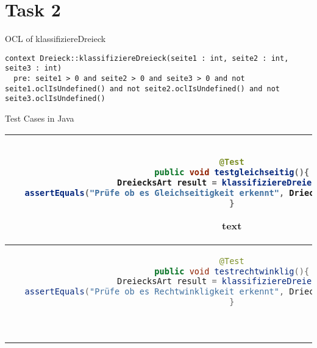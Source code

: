 \chapter{Task 2}
\begin{parlist}
 \item OCL of klassifiziereDreieck
 \begin{lstlisting}[language=OCL,frame=trBL]
context Dreieck::klassifiziereDreieck(seite1 : int, seite2 : int, seite3 : int) 
  pre: seite1 > 0 and seite2 > 0 and seite3 > 0 and not seite1.oclIsUndefined() and not seite2.oclIsUndefined() and not seite3.oclIsUndefined()
\end{lstlisting}
\item Test Cases in Java

\begin{center}
\begin{tabular}{ | c | c | } 
  \hline
  \begin{lstlisting}[language=java,frame=trBL]

@Test
public void testgleichseitig(){
   DreiecksArt result = klassifiziereDreieck(4,4,4);
   assertEquals("Prüfe ob es Gleichseitigkeit erkennt", DriecksArt.Gliechseitig, result);
}
  \end{lstlisting} text& \\ 
  \hline
  \begin{lstlisting}[language=java,frame=trBL]
  @Test
public void testrechtwinklig(){
   DreiecksArt result = klassifiziereDreieck(3,4,5);
   assertEquals("Prüfe ob es Rechtwinkligkeit erkennt", DriecksArt.Rechtwinklig, result);
}
  \end{lstlisting} & \\ 
  \hline
  \begin{lstlisting}[language=java,frame=trBL]
  \end{lstlisting} & \\ 
  \hline
\end{tabular}
\end{center}

\end{parlist}
